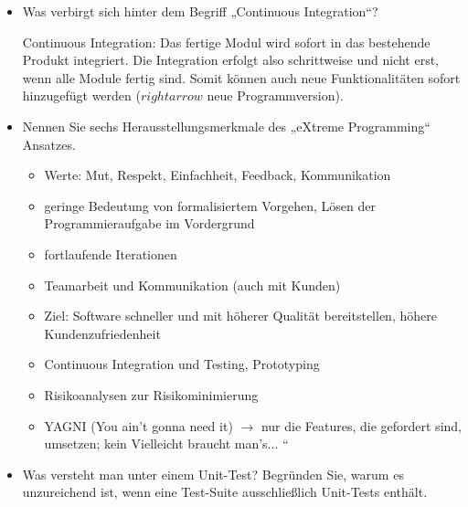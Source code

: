 \documentclass{lehramt-informatik-minimal}
\begin{document}
\begin{itemize}

%

\item Was verbirgt sich hinter dem Begriff „Continuous Integration“?

\begin{antwort}
Continuous Integration: Das fertige Modul wird sofort in das bestehende
Produkt integriert. Die Integration erfolgt also schrittweise und nicht
erst, wenn alle Module fertig sind. Somit können auch neue
Funktionalitäten sofort hinzugefügt werden ($rightarrow$ neue
Programmversion).
\end{antwort}

%

\item Nennen Sie sechs Herausstellungsmerkmale des „eXtreme
Programming“ Ansatzes.

\begin{antwort}
\begin{itemize}
\item Werte: Mut, Respekt, Einfachheit, Feedback, Kommunikation

\item geringe Bedeutung von formalisiertem Vorgehen, Lösen der
Programmieraufgabe im Vordergrund

\item fortlaufende Iterationen

\item Teamarbeit und Kommunikation (auch mit Kunden)

\item Ziel: Software schneller und mit höherer Qualität bereitstellen,
höhere Kundenzufriedenheit

\item Continuous Integration und Testing, Prototyping

\item Risikoanalysen zur Risikominimierung

\item YAGNI (You ain’t gonna need it) $\rightarrow$ nur die Features,
die gefordert sind, umsetzen; kein Vielleicht braucht man’s... “
\end{itemize}
\end{antwort}

%

\item Was versteht man unter einem Unit-Test? Begründen Sie, warum es
unzureichend ist, wenn eine Test-Suite ausschließlich Unit-Tests
enthält.


\end{itemize}
\end{document}
